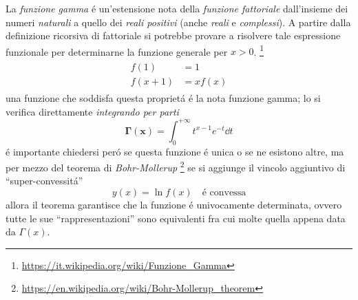 

\usepackage[italian]{babel}





\begin{multicols*}{3}
  La \textit{funzione gamma} \'e un'estensione nota della \textit{funzione fattoriale} dall'insieme dei numeri
  \textit{naturali} a quello dei \textit{reali positivi} (anche \textit{reali} e \textit{complessi}).
  A partire dalla definizione ricorsiva di fattoriale si potrebbe provare a risolvere tale espressione
  funzionale per determinarne la funzione generale per $x > 0$.
  \footnote{\url{https://it.wikipedia.org/wiki/Funzione_Gamma}}
  \begin{align}
    \label{eq:gamma-implicit}
    \begin{split}
      f(1) &= 1 \\
      f(x+1) &= xf(x)
    \end{split}
  \end{align}
  una funzione che soddisfa questa propriet\'a \'e la nota funzione gamma; lo si verifica direttamente
  \textit{integrando per parti}
  \begin{equation}
    \label{eq:gamma-function}
    \boldsymbol{\Gamma(x)} = \int_0^{+\infty}t^{x-1}e^{-t} \dd{t}
  \end{equation}
  \'e importante chiedersi per\'o se questa funzione \'e unica o se ne esistono altre, ma per mezzo del
  teorema di \textit{Bohr-Mollerup}
  \footnote{\url{https://en.wikipedia.org/wiki/Bohr-Mollerup_theorem}}
  se si aggiunge il vincolo aggiuntivo di ``super-convessit\'a''
  \begin{equation}
    \label{eq:super-convexity}
    y(x) = \ln f(x) \quad \text{\'e convessa}
  \end{equation}
  allora il teorema garantisce che la funzione \'e univocamente determinata, ovvero tutte le sue
  ``rappresentazioni'' sono equivalenti fra cui molte quella appena data da $\Gamma(x)$.


\end{multicols*}
